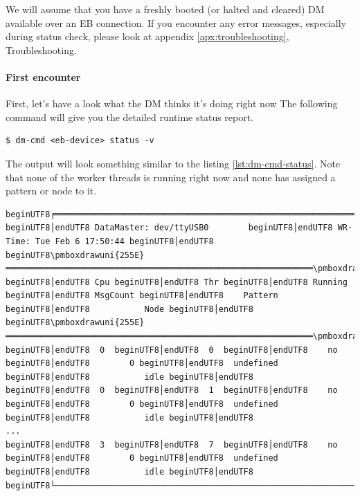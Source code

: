 We will assume that you have a freshly booted (or halted and cleared) DM available over an EB connection. If you encounter any error messages, especially during status check, please look at appendix \ref{apx:troubleshooting}, Troubleshooting.

\paragraph{First encounter}

First, let's have a look what the DM thinks it's doing right now
The following command will give you the detailed runtime status report.
%
\begin{lstlisting}[style = customshell]
$ dm-cmd <eb-device> status -v
\end{lstlisting}
%
The output will look something similar to the listing \ref{lst:dm-cmd-status}. Note that none of the worker threads is running right now and none has assigned a pattern or node to it.

\begin{lstlisting}[style = utf8text,label={lst:dm-cmd-status},caption={Output of dm-cmd status}]
beginUTF8╒══════════════════════════════════════════════════════════════╕endUTF8
beginUTF8│endUTF8 DataMaster: dev/ttyUSB0        beginUTF8│endUTF8 WR-Time: Tue Feb 6 17:50:44 beginUTF8│endUTF8
beginUTF8\pmboxdrawuni{255E}══════════════════════════════════════════════════════════════\pmboxdrawuni{2561}endUTF8
beginUTF8│endUTF8 Cpu beginUTF8│endUTF8 Thr beginUTF8│endUTF8 Running beginUTF8│endUTF8 MsgCount beginUTF8│endUTF8    Pattern beginUTF8│endUTF8           Node beginUTF8│endUTF8
beginUTF8\pmboxdrawuni{255E}══════════════════════════════════════════════════════════════\pmboxdrawuni{2561}endUTF8
beginUTF8│endUTF8  0  beginUTF8│endUTF8  0  beginUTF8│endUTF8    no   beginUTF8│endUTF8        0 beginUTF8│endUTF8  undefined beginUTF8│endUTF8           idle beginUTF8│endUTF8
beginUTF8│endUTF8  0  beginUTF8│endUTF8  1  beginUTF8│endUTF8    no   beginUTF8│endUTF8        0 beginUTF8│endUTF8  undefined beginUTF8│endUTF8           idle beginUTF8│endUTF8
...
beginUTF8│endUTF8  3  beginUTF8│endUTF8  7  beginUTF8│endUTF8    no   beginUTF8│endUTF8        0 beginUTF8│endUTF8  undefined beginUTF8│endUTF8           idle beginUTF8│endUTF8
beginUTF8└──────────────────────────────────────────────────────────────┘endUTF8
\end{lstlisting}


